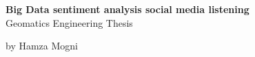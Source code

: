 \documentclass{report}
\author{Hamza Mogni}
\begin{document}
\begin{titlepage}
    \begin{center}
        {\Large \bfseries Big Data sentiment analysis social media listening}\\

        \vfill
        Geomatics Engineering Thesis

        \vfill
        by Hamza Mogni
    \end{center}
\end{titlepage}


\end{document}
